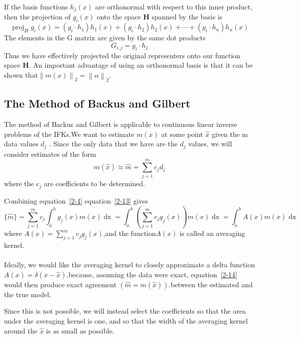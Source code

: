 \documentclass[a4paper]{article}
\newcommand{\tmop}[1]{\ensuremath{\operatorname{#1}}}
\newcommand{\tmstrong}[1]{\textbf{#1}}
\begin{document}
If the basis functions $h_j (x)$ are orthonormal with respect to this inner
product, then the projection of $g_i (x)$ onto the space {\tmstrong{H}}
spanned by the basis is
\[ \tmop{proj}_H g_i (x) = (g_i \cdot h_1) h_1 (x) + (g_i \cdot h_2) h_2 (x) +
   \cdots + (g_i \cdot h_n) h_n (x) \]
The elements in the G matrix are given by the same dot products
\[ G_{i, j} = g_i \cdot h_j \]
Thus we have effectively projected the original representers onto our function
space {\tmstrong{H}}. An important advantage of using an orthonormal basis is
that it can be shown that$\left\| m \left( x \right) \right\|_2 = \left\|
\alpha \right\|_2$.



\subsection{The Method of Backus and Gilbert}

The method of Backus and Gilbert{\cite{3}} is applicable to continuous linear
inverse problems of the IFKs.We want to estimate $m(x)$ at some point $\hat{x}$
given the m data values $d_j$ . Since the only data that we have are the $d_j$
values, we will consider estimates of the form
\begin{equation}
  m ( \hat{x}) \approx \hat{m} = \sum^m_{j = 1} c_j d_j
  \label{2-13}
\end{equation}
where the $c_j$ are coefficients to be determined.

Combining equation~\ref{2-4} equation~\ref{2-13} gives
\begin{equation}
  \{ \hat{m} \}= \sum^m_{j = 1} c_j \int_a^b g_j (x) m (x) \tmop{dx} =
  \int_a^b \left( \sum^m_{j = 1} c_j g_j (x) \right) m (x) \tmop{dx} =
  \int_a^b A (x) m (x) \tmop{dx}
  \label{2-14}
\end{equation}
where $A (x) = \sum^m_{j = 1} c_j g_j (x)$,and the function$A (x)$ is called
an averaging kernel.\\
\\

Ideally, we would like the averaging kernel to closely approximate a delta
function $A (x) = \delta (x - \hat{x})$,because, assuming the data were exact,
equation~\ref{2-14} would then produce exact agreement $\left( \hat{m} = m ( \hat{x})
\right)$.between the estimated and the true model.

Since this is not possible, we will instead select the coefficients so that
the area under the averaging kernel is one, and so that the width of the
averaging kernel around the $\hat{x}$ is as small as possible.
\end{document}
